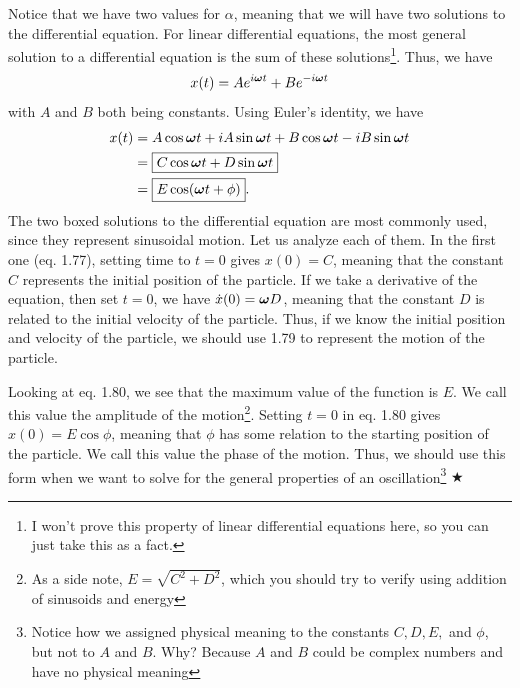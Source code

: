 \noindent Notice that we have two values for $\alpha$, meaning that we will have two solutions to the differential equation. For linear differential equations, the most general solution to a differential equation is the sum of these solutions\footnote{I won't prove this property of linear differential equations here, so you can just take this as a fact.}. Thus, we have 
\begin{equation}
    x(t) = Ae^{i\boldsymbol{\omega} t}+Be^{-i\boldsymbol{\omega} t}
\end{equation}
\noindent with $A$ and $B$ both being constants. Using Euler's identity, we have 
\begin{align}
    x(t) &= A\cos \boldsymbol{\omega} t + iA\sin\boldsymbol{\omega} t + B\cos \boldsymbol{\omega} t - iB\sin\boldsymbol{\omega} t\nonumber \\
    &= \boxed{C\cos \boldsymbol{\omega} t + D\sin \boldsymbol{\omega} t} \\
    &= \boxed{E\cos(\boldsymbol{\omega} t + \phi)}.
\end{align}
\noindent The two boxed solutions to the differential equation are most commonly used, since they represent sinusoidal motion. Let us analyze each of them. In the first one (eq. 1.77), setting time to $t=0$ gives $x(0) = C$, meaning that the constant $C$ represents the initial position of the particle. If we take a derivative of the equation, then set $t=0$, we have $\dot{x}(0) = \boldsymbol{\omega} D$, meaning that the constant $D$ is related to the initial velocity of the particle. Thus, if we know the initial position and velocity of the particle, we should use 1.79 to represent the motion of the particle. 

\noindent Looking at eq. 1.80, we see that the maximum value of the function is $E$. We call this value the amplitude of the motion\footnote{As a side note, $E = \sqrt{C^2 + D^2}$, which you should try to verify using addition of sinusoids and energy}. Setting $t=0$ in eq. 1.80 gives $x(0) = E\cos \phi$, meaning that $\phi$ has some relation to the starting position of the particle. We call this value the phase of the motion. Thus, we should use this form when we want to solve for the general properties of an oscillation\footnote{Notice how we assigned physical meaning to the constants $C, D, E,$ and $\phi$, but not to $A$ and $B$. Why? Because $A$ and $B$ could be complex numbers and have no physical meaning} $\bigstar$ 

%
%
